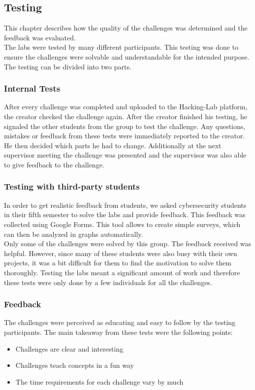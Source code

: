 \label{sec:testing}
\subsection{Testing}
This chapter describes how the quality of the challenges was determined and the feedback was evaluated. \\
The labs were tested by many different participants. This testing was done to ensure the challenges were solvable and understandable for the intended purpose. The testing can be divided into two parts.

\subsubsection{Internal Tests}
After every challenge was completed and uploaded to the Hacking-Lab platform, the creator checked the challenge again. After the creator finished his testing, he signaled the other students from the group to test the challenge. Any questions, mistakes or feedback from these tests were immediately reported to the creator. He then decided which parts he had to change. Additionally at the next supervisor meeting the challenge was presented and the supervisor was also able to give feedback to the challenge.

\subsubsection{Testing with third-party students}
In order to get realistic feedback from students, we asked cybersecurity students in their fifth semester to solve the labs and provide feedback. This feedback was collected using Google Forms. This tool allows to create simple surveys, which can then be analyzed in graphs automatically. \\
Only some of the challenges were solved by this group. The feedback received was helpful. However, since many of these students were also busy with their own projects, it was a bit difficult for them to find the motivation to solve them thoroughly. Testing the labs meant a significant amount of work and therefore these tests were only done by a few individuals for all the challenges.

\subsubsection{Feedback}
The challenges were perceived as educating and easy to follow by the testing participants. The main takeaway from these tests were the following points:
\begin{itemize}
    \item Challenges are clear and interesting
    \item Challenges teach concepts in a fun way
    \item The time requirements for each challenge vary by much
  \end{itemize}

